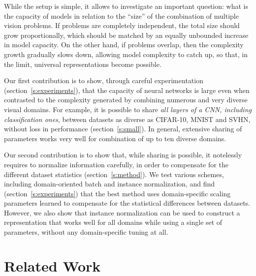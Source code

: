 \documentclass[10pt,twocolumn,letterpaper]{article}
\begin{document}
While the setup is simple, it allows to investigate an important question: what is the capacity of models in relation to the ``size'' of the combination of multiple vision problems. If problems are completely independent, the total size should grow proportionally, which should be matched by an equally unbounded increase in model capacity. On the other hand, if problems overlap, then the complexity growth gradually slows down, allowing model complexity to catch up, so that, in the limit, universal representations become possible.

Our first contribution is to show, through careful experimentation (section~\ref{s:experiments}), that the capacity of neural networks is large even when contrasted to the complexity generated by combining numerous and very diverse visual domains. For example, it is possible to share \emph{all layers of a CNN, including classification ones}, between datasets as diverse as CIFAR-10, MNIST and SVHN, without loss in performance (section~\ref{s:small}). In general, extensive sharing of parameters works very well for combination of up to ten diverse domains.

Our second contribution is to show that, while sharing is possible, it notelessly requires to normalize information carefully, in order to compensate for the different dataset statistics (section~\ref{s:method}). We test various schemes, including domain-oriented batch and instance normalization, and find (section~\ref{s:experiments}) that the best method uses domain-specific scaling parameters learned to compensate for the statistical differences between datasets. However, we also show that instance normalization can be used to construct a representation that works well for all domains while using a single set of parameters, without any domain-specific tuning at all.


\section{Related Work}\label{s:related}
\end{document}
